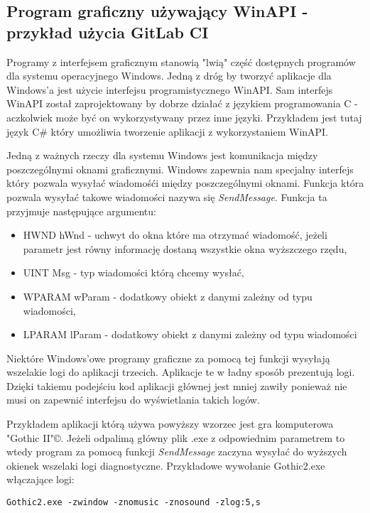 \subsection{Program graficzny używający WinAPI - przykład użycia GitLab CI}
Programy z interfejsem graficznym stanowią "lwią" część dostępnych programów dla systemu operacyjnego Windows. Jedną z dróg by tworzyć aplikacje dla Windows'a jest użycie interfejsu programistycznego WinAPI. Sam interfejs WinAPI został zaprojektowany by dobrze działać z językiem programowania C - \cite{WinAPI} aczkolwiek może być on wykorzystywany przez inne języki. Przykładem jest tutaj język C\# który umożliwia tworzenie aplikacji z wykorzystaniem WinAPI. 
\par
Jedną z ważnych rzeczy dla systemu Windows jest komunikacja między poszczególnymi oknami graficznymi. Windows zapewnia nam specjalny interfejs który pozwala wysyłać wiadomośći między poszczególnymi oknami. Funkcja która pozwala wysyłać takowe wiadomości nazywa się \textit{SendMessage}. Funkcja ta przyjmuje następujące argumentu:
\begin{itemize}
  \item HWND hWnd - uchwyt do okna które ma otrzymać wiadomość, jeżeli parametr jest równy informację dostaną wszystkie okna wyższczego rzędu,
  \item UINT Msg - typ wiadomości którą chcemy wysłać,
  \item WPARAM wParam - dodatkowy obiekt z danymi zależny od typu wiadomości,
  \item LPARAM lParam - dodatkowy obiekt z danymi zależny od typu wiadomości
\end{itemize}
Niektóre Windows'owe programy graficzne za pomocą tej funkcji wysyłają wszelakie logi do aplikacji trzecich. Aplikacje te w ładny sposób prezentują logi. Dzięki takiemu podejściu kod aplikacji głównej jest mniej zawiły ponieważ nie musi on zapewnić interfejsu do wyświetlania takich logów.
\par
Przykładem aplikacji którą używa powyższy wzorzec jest gra komputerowa "Gothic II"©. Jeżeli odpalimą główny plik .exe z odpowiednim parametrem to wtedy program za pomocą funkcji \textit{SendMessage} zaczyna wysyłać do wyższych okienek wszelaki logi diagnostyczne. Przykładowe wywołanie Gothic2.exe włączające logi:
\begin{lstlisting}[caption={Gra Gothic włącza się w trybie okienkowym, bez muzyki i dźwięków oraz z wysyłaniem logów}]
  Gothic2.exe -zwindow -znomusic -znosound -zlog:5,s
\end{lstlisting}
